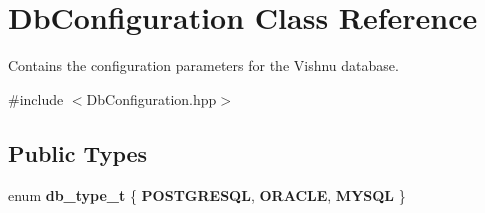 \hypertarget{classDbConfiguration}{
\section{DbConfiguration Class Reference}
\label{classDbConfiguration}
}


Contains the configuration parameters for the Vishnu database.  




{\ttfamily \#include $<$DbConfiguration.hpp$>$}

\subsection*{Public Types}
\begin{DoxyCompactItemize}
\item 
enum {\bfseries db\_\-type\_\-t} \{ {\bfseries POSTGRESQL}, 
{\bfseries ORACLE}, 
{\bfseries MYSQL}
 \}
\end{DoxyCompactItemize}
